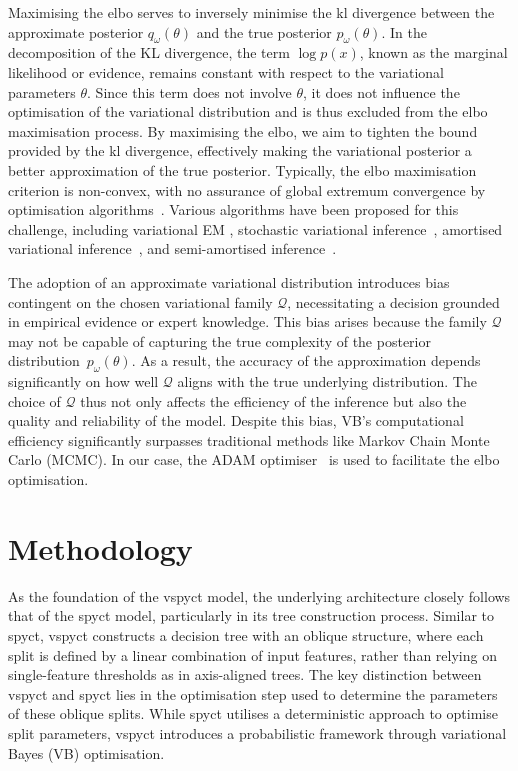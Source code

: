 \documentclass[3p,review,authoryear]{elsarticle}
\begin{document}
Maximising the \gls{elbo} serves to inversely minimise the \gls{kl} divergence between the approximate posterior \(q_\omega(\theta)\) and the true posterior \(p_\omega(\theta)\).
In the decomposition of the KL divergence, the term \(\log p(x)\), known as the marginal likelihood or evidence, remains constant with respect to the variational parameters \(\theta\).
Since this term does not involve \(\theta\), it does not influence the optimisation of the variational distribution and is thus excluded from the \gls{elbo} maximisation process.
By maximising the \gls{elbo}, we aim to tighten the bound provided by the \gls{kl} divergence, effectively making the variational posterior a better approximation of the true posterior.
Typically, the \gls{elbo} maximisation criterion is non-convex, with no assurance of global extremum convergence by optimisation algorithms~\citep[Chapter~10]{murphy2023probabilistic}.
Various algorithms have been proposed for this challenge, including variational EM \citep{bernardo2003variational}, stochastic variational inference~\citep{hoffman2013stochastic, sashank2018convergence}, amortised variational inference~\citep{gershman2014amortized, le2017inference}, and semi-amortised inference~\citep{kim2018semi}.

The adoption of an approximate variational distribution introduces bias contingent on the chosen variational family $\mathcal{Q}$, necessitating a decision grounded in empirical evidence or expert knowledge.
This bias arises because the family \(\mathcal{Q}\) may not be capable of capturing the true complexity of the posterior distribution~\(p_\omega(\theta)\).
As a result, the accuracy of the approximation depends significantly on how well \(\mathcal{Q}\) aligns with the true underlying distribution.
The choice of \(\mathcal{Q}\) thus not only affects the efficiency of the inference but also the quality and reliability of the model.
Despite this bias, VB's computational efficiency significantly surpasses traditional methods like Markov Chain Monte Carlo (MCMC).
In our case, the ADAM optimiser~\citep{kingma2014adam} is used to facilitate the \gls{elbo} optimisation.


\section{Methodology}

As the foundation of the \gls{vspyct} model, the underlying architecture closely follows that of the \gls{spyct} model, particularly in its tree construction process.
Similar to \gls{spyct}, \gls{vspyct} constructs a decision tree with an oblique structure, where each split is defined by a linear combination of input features, rather than relying on single-feature thresholds as in axis-aligned trees.
The key distinction between \gls{vspyct} and \gls{spyct} lies in the optimisation step used to determine the parameters of these oblique splits.
While \gls{spyct} utilises a deterministic approach to optimise split parameters, \gls{vspyct} introduces a probabilistic framework through variational Bayes (VB) optimisation.
\end{document}

